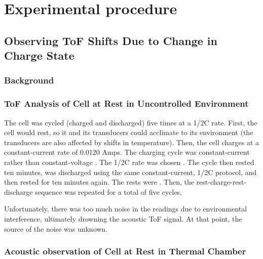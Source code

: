 
\chapter{Experimental procedure}

\section{Observing ToF Shifts Due to Change in Charge State}

\subsection{Background}

\subsection{ToF Analysis of Cell at Rest in Uncontrolled Environment}

The cell was cycled (charged and discharged) five times at a 1/2C rate. First, the cell would rest, so it and its transducers could acclimate to its environment (the transducers are also affected by shifts in temperature). Then, the cell charges at a constant-current rate of 0.0120 Amps. The charging cycle was constant-current rather than constant-voltage . The 1/2C rate was chosen . The cycle then rested ten minutes, was discharged using the same constant-current, 1/2C protocol, and then rested for ten minutes again. The rests were . Then, the rest-charge-rest-discharge sequence was repeated for a total of five cycles.


Unfortunately, there was too much noise in the readings due to environmental interference, ultimately drowning the acoustic ToF signal. At that point, the source of the noise was unknown.

    
\subsection{Acoustic observation of Cell at Rest in Thermal Chamber}

